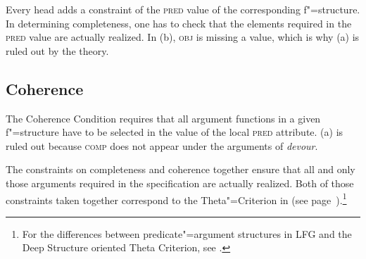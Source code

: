 Every head adds a constraint of the \textsc{pred} value of the corresponding f"=structure. In determining completeness, one has to check that the elements required
in the \textsc{pred} value are actually realized. In (b), \textsc{obj} is missing a value, which is
why (a) is ruled out by the theory.

\eal
{}
\zl

\subsection{Coherence}

\addlines
The Coherence Condition requires that all argument functions in a given f"=structure have to be selected in the value of the local 
 \textsc{pred} attribute. (a) is ruled out because \textsc{comp} does not appear under the arguments of \emph{devour}.

\eal
{}
\zl

\noindent
The constraints on completeness and coherence together ensure that all and only those arguments required in
the \pred specification are actually realized.
Both of those constraints taken together correspond to the Theta"=Criterion in \gbt (see
page~\pageref{theta-Kriterium}).\footnote{
For the differences between predicate"=argument structures in LFG and the Deep Structure oriented Theta Criterion, see .} 


